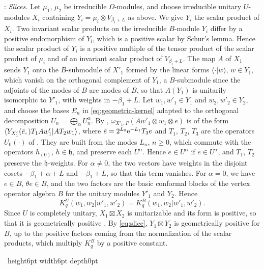 \documentclass[leqno]{article}
\renewcommand{\geq}{\ensuremath{\geqslant}}
\newcommand{\qed}{\hfill \vrule height6pt  width6pt depth0pt}
\newcommand{\ot}{\otimes}
\let\i\relax %
\newcommand{\i}{\mathrm{i}}
\newcommand{\e}{\mathrm{e}} %
\newenvironment{proof}[1][]{\noindent {\it Proof #1} : }{\hbox{~}\qed
\smallskip
}
\numberwithin{equation}{section}
\begin{document}
\begin{proof}
\emph{Slices.} Let $\mu_1$, $\mu_2$ be irreducible $\Omega$-modules, and choose irreducible unitary $U$-modules $X_i$ containing $Y_i = \mu_i \ot V_{\beta_i+L}$ as above. We give $Y_i$ the scalar product of $X_i$. Two invariant scalar products on the irreducible $B$-module $Y_i$ differ by a positive endomorphism of $Y_i$, which is a positive scalar by Schur's lemma. Hence the scalar product of $Y_i$ is a positive multiple of the tensor product of the scalar product of $\mu_i$ and of an invariant scalar product of $V_{\beta_i+L}$. The map $A$ of $X_1$ sends $Y_1$ onto the $B$-submodule of $X'_1$ formed by the linear forms $\langle \cdot|w\rangle$, $w \in Y_1$, which vanish on the orthogonal complement of $Y_1$, a $B$-submodule since the adjoints of the modes of $B$ are modes of $B$, so that $A(Y_1)$ is unitarily isomorphic to $Y'_1$, with weights in $-\beta_1+L$. Let $w_1,w'_1 \in Y_1$ and $w_2,w'_2 \in Y_2$, and choose the bases $E_n$ in \eqref{eq:geometric-kernel} adapted to the orthogonal decomposition $U_n = \bigoplus_\alpha U^\alpha_n$. By \cite[(6.11) and (6.12) p.~40]{Gui24}, $\omega_{X'_1,P}(Aw'_1 \ot w_1 \ot e)$ is of the form $\langle Y_{X'_1}(\tilde e,\i)T_1Aw'_1|AT_2w_1\rangle$, where $\tilde e = 2^{L_0}\e^{-\i L_1}T_3e$ and $T_1$, $T_2$, $T_3$ are the operators $U_0(\cdot)$ of \cite[(6.12) p.~40]{Gui24}. They are built from the modes $L_n$, $n \geq 0$, which commute with the operators $h_{(0)}$, $h \in \mathfrak h$, and preserve each $U^\alpha$. Hence $\tilde e \in U^\alpha$ if $e \in U^\alpha$, and $T_1$, $T_2$ preserve the $\mathfrak h$-weights. For $\alpha \neq 0$, the two vectors have weights in the disjoint cosets $-\beta_1+\alpha+L$ and $-\beta_1+L$, so that this term vanishes. For $\alpha = 0$, we have $e \in B$, $\theta e \in B$, and the two factors are the basic conformal blocks of the vertex operator algebra $B$ for the unitary modules $Y'_1$ and $Y_2$. Hence
\begin{equation}
\label{eq:slice}
K^U_q(w_1,w_2  |  w'_1,w'_2) = K^B_q(w_1,w_2  |  w'_1,w'_2).
\end{equation}
Since $U$ is completely unitary, $X_1 \boxtimes X_2$ is unitarizable and its form is positive, so that it is geometrically positive \cite[Corollary 8.4 p.~53]{Gui24}. By \eqref{eq:slice}, $Y_1 \boxtimes Y_2$ is geometrically positive for $B$, up to the positive factors coming from the normalization of the scalar products, which multiply $K^B_q$ by a positive constant.


\end{proof}
\end{document}
